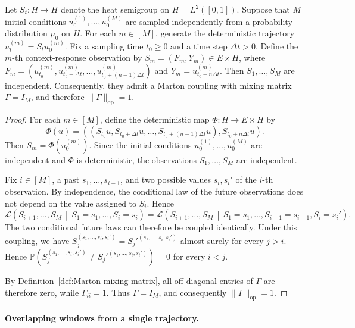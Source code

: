 \begin{example}
\label{ex:Heat equation Marton coupling}
Let \(S_t:H\to H\) denote the heat semigroup on \(H=L^2([0,1])\). Suppose that \(M\) initial conditions \(u_0^{(1)},\ldots,u_0^{(M)}\) are sampled independently from a probability distribution \(\mu_0\) on \(H\). For each \(m\in[M]\), generate the deterministic trajectory \(u_t^{(m)}=S_tu_0^{(m)}\).
Fix a sampling time \(t_0\geq0\) and a time step \(\Delta t>0\). Define the \(m\)-th context-response observation by \(S_m=(F_m,Y_m)\in E\times H\), where
\(
F_m
=
\left(
u_{t_0}^{(m)},
u_{t_0+\Delta t}^{(m)},
\ldots,
u_{t_0+(n-1)\Delta t}^{(m)}
\right)
\)
and \(Y_m=u_{t_0+n\Delta t}^{(m)}\).
Then \(S_1,\ldots,S_M\) are independent. Consequently, they admit a Marton coupling with mixing matrix \(\Gamma=I_M\), and therefore \(\|\Gamma\|_{\mathrm{op}}=1\).
\end{example}

\begin{proof}
For each \(m\in[M]\), define the deterministic map \(\Phi:H\to E\times H\) by
\[
\Phi(u)
=
\left(
\left(
S_{t_0}u,
S_{t_0+\Delta t}u,
\ldots,
S_{t_0+(n-1)\Delta t}u
\right),
S_{t_0+n\Delta t}u
\right).
\]
Then \(S_m=\Phi(u_0^{(m)})\). Since the initial conditions \(u_0^{(1)},\ldots,u_0^{(M)}\) are independent and \(\Phi\) is deterministic, the observations \(S_1,\ldots,S_M\) are independent.

Fix \(i\in[M]\), a past \(s_1,\ldots,s_{i-1}\), and two possible values \(s_i,s_i'\) of the \(i\)-th observation. By independence, the conditional law of the future observations does not depend on the value assigned to \(S_i\). Hence
\[
\mathcal L
\left(
S_{i+1},\ldots,S_M
\,\middle|\,
S_1=s_1,\ldots,S_i=s_i
\right)
=
\mathcal L
\left(
S_{i+1},\ldots,S_M
\,\middle|\,
S_1=s_1,\ldots,S_{i-1}=s_{i-1},S_i=s_i'
\right).
\]
The two conditional future laws can therefore be coupled identically. Under this coupling, we have \(S_j^{(s_1,\ldots,s_i,s_i')}=S_j'^{(s_1,\ldots,s_i,s_i')}\) almost surely for every \(j>i\). Hence
\(
\mathbb P
\left(
S_j^{(s_1,\ldots,s_i,s_i')}
\neq
S_j'^{(s_1,\ldots,s_i,s_i')}
\right)
=
0
\)
for every \(i<j\).

By Definition~\ref{def:Marton mixing matrix}, all off-diagonal entries of \(\Gamma\) are therefore zero, while \(\Gamma_{ii}=1\). Thus \(\Gamma=I_M\), and consequently \(\|\Gamma\|_{\mathrm{op}}=1\).
\end{proof}

\paragraph{Overlapping windows from a single trajectory.}

